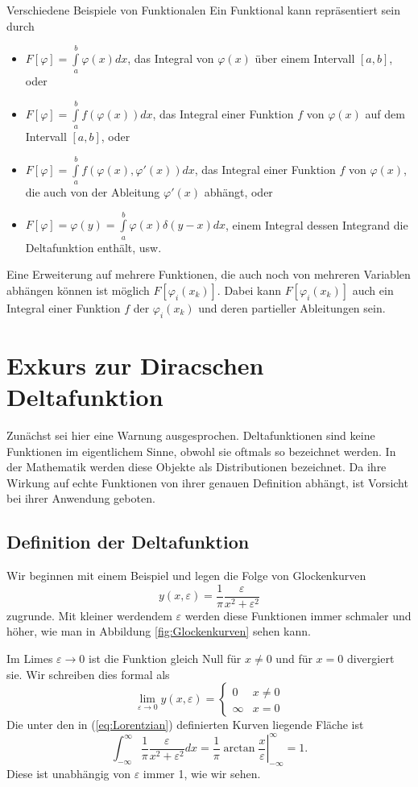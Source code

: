 \begin{example}{Verschiedene Beispiele von Funktionalen}
Ein Funktional kann repräsentiert sein durch
\begin{itemize}
\item 
$F[\varphi]=\int\limits_a^b\varphi(x)dx$, das Integral von $\varphi(x)$
  über einem Intervall $[a,b]$, oder
\item 
  $F[\varphi]=\int\limits_a^bf(\varphi(x))dx$, das Integral einer Funktion
  $f$ von $\varphi(x)$ auf dem Intervall $[a,b]$, oder
\item 
  $F[\varphi]=\int\limits_a^bf(\varphi(x), \varphi'(x))dx$, das Integral
  einer Funktion $f$ von $\varphi(x)$, die auch von der Ableitung $\varphi'(x)$
  abhängt, oder 
\item 
  $F[\varphi]=\varphi(y)=\int\limits_a^b\varphi(x)\delta(y-x)dx$, einem
  Integral dessen Integrand die Deltafunktion enthält, usw. 
\end{itemize}
  Eine Erweiterung auf mehrere Funktionen, die auch noch von mehreren Variablen
  abhängen können ist möglich $F[\varphi_i(x_k)]$. Dabei kann
  $F[\varphi_i(x_k)]$ auch ein Integral einer Funktion $f$ der $\varphi_i(x_k)$
  und deren partieller Ableitungen sein.
\end{example}
\section{Exkurs zur Diracschen Deltafunktion}\label{sec:Deltafunktion}
Zunächst sei hier eine Warnung ausgesprochen. Deltafunktionen sind keine
Funktionen im eigentlichem Sinne, obwohl sie oftmals so bezeichnet werden. In
der Mathematik werden diese Objekte als Distributionen bezeichnet. Da ihre
Wirkung auf echte Funktionen von ihrer genauen Definition abhängt, ist
Vorsicht bei ihrer Anwendung geboten.
\subsection{Definition der Deltafunktion}
Wir beginnen mit einem Beispiel und legen die Folge von Glockenkurven
\begin{equation}\label{eq:Lorentzian}
y(x,\varepsilon)=\frac{1}{\pi}\frac{\varepsilon}{x^2+\varepsilon^2}
\end{equation}
zugrunde. Mit kleiner werdendem $\varepsilon$ werden diese Funktionen immer
schmaler und höher, wie man in Abbildung \ref{fig:Glockenkurven} sehen kann.

Im Limes $\varepsilon\rightarrow 0$ ist die Funktion gleich Null für $x\ne 0$
und für $x=0$ divergiert sie. Wir schreiben dies formal als
\[ \lim_{\varepsilon\rightarrow 0} y(x,\varepsilon)=
  \left\{\begin{matrix}0& x\ne 0\\\infty& x=0\end{matrix}\right.\]
Die unter den in (\ref{eq:Lorentzian}) definierten Kurven liegende Fläche ist
\[\int_{-\infty}^{\infty}\frac{1}{\pi}\frac{\varepsilon}{x^2+\varepsilon^2}dx=
  \left.\frac{1}{\pi}\arctan \frac{x}{\varepsilon}\right|_{-\infty}^{\infty}=1.\]
Diese ist unabhängig von $\varepsilon$ immer 1, wie wir sehen.

